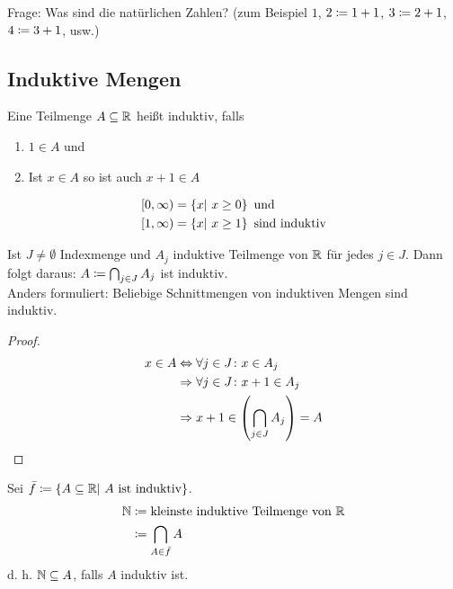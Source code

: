 \thispagestyle{pagenumberonly}
Frage: Was sind die natürlichen Zahlen? (zum Beispiel $1$, $2\coloneqq 1+1$, $3\coloneqq 2+1$, $4\coloneqq 3+1$, usw.)

\subsection{Induktive Mengen}
\begin{definition}
    Eine Teilmenge $A\subseteq \mathbb{R}$ heißt induktiv, falls
    \begin{enumerate}
        \item $1\in A$ und
        \item Ist $x\in A$ so ist auch $x+1\in A$
    \end{enumerate}
\end{definition}

\begin{beispiel}
    \begin{align*}
        \left[0, \infty\right) &= \left\{x|~x\geq 0\right\}\text{ und}\\
        \left[1, \infty\right) &= \left\{x|~x\geq 1\right\} \text{ sind induktiv}
    \end{align*}
\end{beispiel}

\begin{beobachtung}
    Ist $J\neq\emptyset$ Indexmenge und $A_j$ induktive Teilmenge von $\mathbb{R}$ für jedes $j\in J$.
    Dann folgt daraus: $A\coloneqq \bigcap_{j\in J}A_j$ ist induktiv.\\
    Anders formuliert: Beliebige Schnittmengen von induktiven Mengen sind induktiv.
    \begin{proof}
        \begin{align*}
            x\in A &\Leftrightarrow{} \forall j\in J\colon x \in A_j\\
            &\Rightarrow{} \forall j\in J\colon x+1 \in A_j\\
            &\Rightarrow{} x+1 \in \left(\bigcap_{j\in J}A_j\right)=A\qedhere
        \end{align*}
    \end{proof}
\end{beobachtung}

\begin{definition}
    Sei $\bar{f}\coloneqq\left\{A\subseteq \mathbb{R}|~A\text{ ist induktiv}\right\}$.
    \begin{align*}
        \mathbb{N} &\coloneqq \text{kleinste induktive Teilmenge von }\mathbb{R}\\
        &\coloneqq \bigcap_{A\in \bar{f}}A
    \end{align*}
    d. h. $\mathbb{N}\subseteq A$, falls $A$ induktiv ist.
\end{definition}


